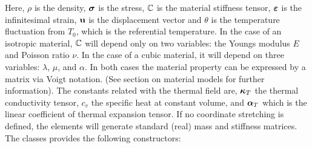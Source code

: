Here, $\rho$ is the density, $\boldsymbol{\sigma}$ is the stress, $\mathbb{C}$ is the
material stiffness tensor, $\boldsymbol{\varepsilon}$ is the infinitesimal strain, 
$\mathbf{u}$ is the displacement vector and $\theta$ is the temperature
fluctuation from $T_0$, which is the referential temperature.
In the case of an isotropic material,
$\mathbb{C}$ will depend only on two variables: the Youngs modulus $E$ and 
Poisson ratio $\nu$. In the case of a cubic material, it will depend
on three variables: $\lambda$, $\mu$, and $\alpha$.  In both cases 
the material property can be expressed by a matrix via Voigt notation. 
(See section on material models for further information). The constants
related with the thermal field are, $\boldsymbol{\kappa}_T$ the thermal conductivity
tensor, $c_v$ the specific heat at constant volume, and $\boldsymbol{\alpha}_T$ which
is the linear coefficient of thermal expansion tensor. 
If no coordinate stretching is defined, the elements will generate 
standard (real) mass and stiffness matrices.
The classes provides the following constructors:
